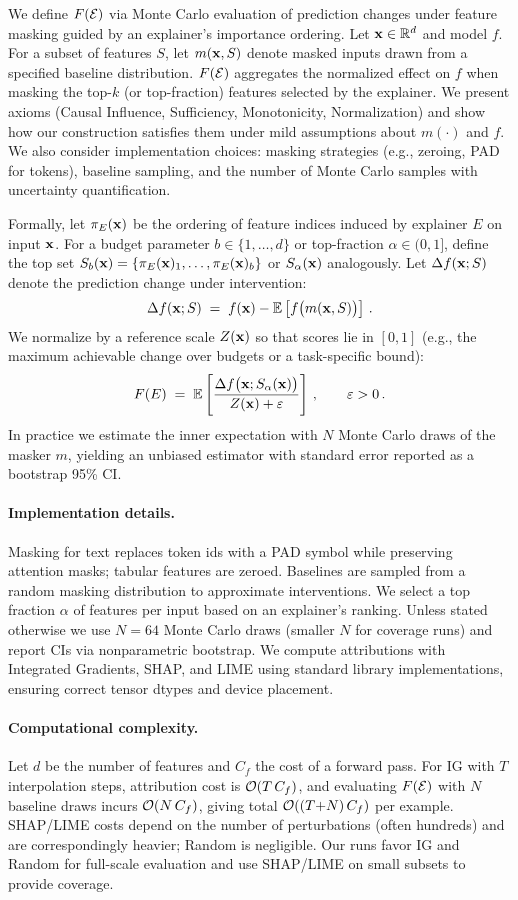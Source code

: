 We define $F(\mathcal{E})$ via Monte Carlo evaluation of prediction changes under feature masking guided by an explainer’s importance ordering. Let $\mathbf{x} \in \mathbb{R}^d$ and model $f$. For a subset of features $S$, let $m(\mathbf{x}, S)$ denote masked inputs drawn from a specified baseline distribution. $F(\mathcal{E})$ aggregates the normalized effect on $f$ when masking the top-$k$ (or top-fraction) features selected by the explainer. We present axioms (Causal Influence, Sufficiency, Monotonicity, Normalization) and show how our construction satisfies them under mild assumptions about $m(\cdot)$ and $f$. We also consider implementation choices: masking strategies (e.g., zeroing, PAD for tokens), baseline sampling, and the number of Monte Carlo samples with uncertainty quantification.

Formally, let $\pi_E(\mathbf{x})$ be the ordering of feature indices induced by explainer $E$ on input $\mathbf{x}$. For a budget parameter $b\in\{1,\dots,d\}$ or top-fraction $\alpha\in(0,1]$, define the top set $S_b(\mathbf{x}) = \{\pi_E(\mathbf{x})_1,\dots,\pi_E(\mathbf{x})_b\}$ or $S_\alpha(\mathbf{x})$ analogously.
Let $\Delta f(\mathbf{x};S)$ denote the prediction change under intervention:
\[
\Delta f(\mathbf{x};S) \;=\; f(\mathbf{x}) - \mathbb{E}\left[  f\big(m(\mathbf{x}, S)\big)  \right]\,.
\]
We normalize by a reference scale $Z(\mathbf{x})$ so that scores lie in $[0,1]$ (e.g., the maximum achievable change over budgets or a task-specific bound):
\[
F(E) \;=\; \mathbb{E}\left[  \frac{ \Delta f\big(\mathbf{x}; S_\alpha(\mathbf{x})\big) }{ Z(\mathbf{x}) + \varepsilon }  \right]\,, \qquad \varepsilon>0\,.
\]
In practice we estimate the inner expectation with $N$ Monte Carlo draws of the masker $m$, yielding an unbiased estimator with standard error reported as a bootstrap 95\% CI.

\paragraph{Implementation details.}
Masking for text replaces token ids with a PAD symbol while preserving attention masks; tabular features are zeroed. Baselines are sampled from a random masking distribution to approximate interventions. We select a top fraction $\alpha$ of features per input based on an explainer’s ranking. Unless stated otherwise we use $N\!=\!64$ Monte Carlo draws (smaller $N$ for coverage runs) and report CIs via nonparametric bootstrap. We compute attributions with Integrated Gradients, SHAP, and LIME using standard library implementations, ensuring correct tensor dtypes and device placement.

\paragraph{Computational complexity.}
Let $d$ be the number of features and $C_f$ the cost of a forward pass. For IG with $T$ interpolation steps, attribution cost is $\mathcal{O}(T\,C_f)$, and evaluating $F(\mathcal{E})$ with $N$ baseline draws incurs $\mathcal{O}(N\,C_f)$, giving total $\mathcal{O}((T{+}N)\,C_f)$ per example. SHAP/LIME costs depend on the number of perturbations (often hundreds) and are correspondingly heavier; Random is negligible. Our runs favor IG and Random for full-scale evaluation and use SHAP/LIME on small subsets to provide coverage.

